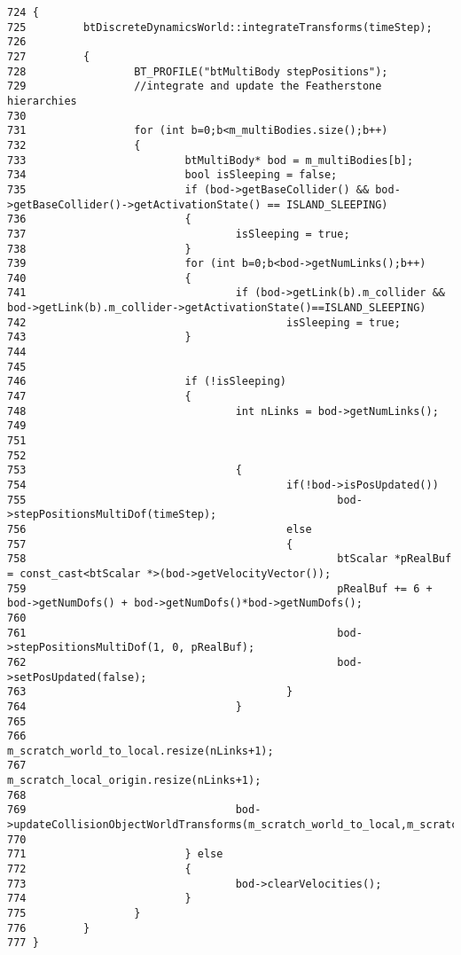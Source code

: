 \begin{Code}\begin{verbatim}724 {
725         btDiscreteDynamicsWorld::integrateTransforms(timeStep);
726 
727         {
728                 BT_PROFILE("btMultiBody stepPositions");
729                 //integrate and update the Featherstone hierarchies
730         
731                 for (int b=0;b<m_multiBodies.size();b++)
732                 {
733                         btMultiBody* bod = m_multiBodies[b];
734                         bool isSleeping = false;
735                         if (bod->getBaseCollider() && bod->getBaseCollider()->getActivationState() == ISLAND_SLEEPING)
736                         {
737                                 isSleeping = true;
738                         } 
739                         for (int b=0;b<bod->getNumLinks();b++)
740                         {
741                                 if (bod->getLink(b).m_collider && bod->getLink(b).m_collider->getActivationState()==ISLAND_SLEEPING)
742                                         isSleeping = true;
743                         }
744 
745 
746                         if (!isSleeping)
747                         {
748                                 int nLinks = bod->getNumLinks();
749 
751                         
752                                 
753                                 {
754                                         if(!bod->isPosUpdated())
755                                                 bod->stepPositionsMultiDof(timeStep);
756                                         else
757                                         {
758                                                 btScalar *pRealBuf = const_cast<btScalar *>(bod->getVelocityVector());
759                                                 pRealBuf += 6 + bod->getNumDofs() + bod->getNumDofs()*bod->getNumDofs();
760 
761                                                 bod->stepPositionsMultiDof(1, 0, pRealBuf);
762                                                 bod->setPosUpdated(false);
763                                         }
764                                 }
765                                 
766                                 m_scratch_world_to_local.resize(nLinks+1);
767                                 m_scratch_local_origin.resize(nLinks+1);
768 
769                                 bod->updateCollisionObjectWorldTransforms(m_scratch_world_to_local,m_scratch_local_origin);
770                                 
771                         } else
772                         {
773                                 bod->clearVelocities();
774                         }
775                 }
776         }
777 }
\end{verbatim}
\end{Code}




